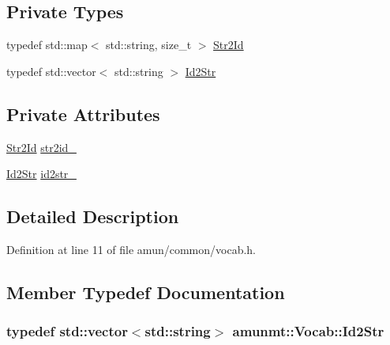 \subsection*{Private Types}
\begin{DoxyCompactItemize}
\item 
typedef std\+::map$<$ std\+::string, size\+\_\+t $>$ \hyperlink{classamunmt_1_1Vocab_aa5df0ddc7a061269c9d22892fa07e060}{Str2\+Id}
\item 
typedef std\+::vector$<$ std\+::string $>$ \hyperlink{classamunmt_1_1Vocab_a3cdf2946c36276f80c05e29d601c11fc}{Id2\+Str}
\end{DoxyCompactItemize}
\subsection*{Private Attributes}
\begin{DoxyCompactItemize}
\item 
\hyperlink{classamunmt_1_1Vocab_aa5df0ddc7a061269c9d22892fa07e060}{Str2\+Id} \hyperlink{classamunmt_1_1Vocab_a65742057ec048992dcc4ddca523b572f}{str2id\+\_\+}
\item 
\hyperlink{classamunmt_1_1Vocab_a3cdf2946c36276f80c05e29d601c11fc}{Id2\+Str} \hyperlink{classamunmt_1_1Vocab_a1eb74fdcd40400033cd54de1b6479a46}{id2str\+\_\+}
\end{DoxyCompactItemize}


\subsection{Detailed Description}


Definition at line 11 of file amun/common/vocab.\+h.



\subsection{Member Typedef Documentation}
\subsubsection[{\texorpdfstring{Id2\+Str}{Id2Str}}]{\setlength{\rightskip}{0pt plus 5cm}typedef std\+::vector$<$std\+::string$>$ {\bf amunmt\+::\+Vocab\+::\+Id2\+Str}\hspace{0.3cm}{\ttfamily [private]}}\hypertarget{classamunmt_1_1Vocab_a3cdf2946c36276f80c05e29d601c11fc}{}\label{classamunmt_1_1Vocab_a3cdf2946c36276f80c05e29d601c11fc}



